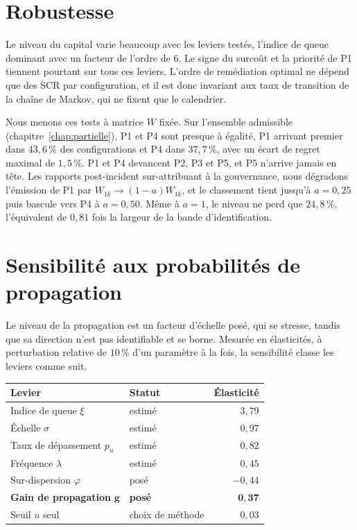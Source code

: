 \section{Robustesse}
\label{sec:res-robustesse}

Le niveau du capital varie beaucoup avec les leviers testés, l'indice de queue dominant avec
un facteur de l'ordre de $6$. Le signe du surcoût et la priorité de P1 tiennent pourtant sur tous
ces leviers. L'ordre de remédiation optimal ne dépend que des SCR par configuration, et il
est donc invariant aux taux de transition de la chaîne de Markov, qui ne fixent que le calendrier.

Nous menons ces tests à matrice $W$ fixée. Sur l'ensemble admissible (chapitre~\ref{chap:partielle}),
P1 et P4 sont presque à égalité, P1 arrivant premier dans $43{,}6\,\%$ des configurations et P4 dans
$37{,}7\,\%$, avec un écart de regret maximal de $1{,}5\,\%$. P1 et P4 devancent P2, P3 et
P5, et P5 n'arrive jamais en tête. Les rapports post-incident sur-attribuant à la gouvernance, nous
dégradons l'émission de P1 par $W_{1k}\to(1-a)W_{1k}$, et le classement tient jusqu'à $a=0{,}25$
puis bascule vers P4 à $a=0{,}50$. Même à $a=1$, le niveau ne perd que $24{,}8\,\%$, l'équivalent de
$0{,}81$ fois la largeur de la bande d'identification.

\section{Sensibilité aux probabilités de propagation}
\label{sec:sensibilite-propagation}

Le niveau de la propagation est un facteur d'échelle posé, qui se stresse, tandis que sa direction
n'est pas identifiable et se borne. Mesurée en élasticités, à perturbation relative de $10\,\%$ d'un paramètre
à la fois, la sensibilité classe les leviers comme suit.

\begin{center}\footnotesize
\renewcommand{\arraystretch}{1.15}
\begin{tabular}{@{}l l r@{}}
\toprule
\textbf{Levier} & \textbf{Statut} & \textbf{Élasticité} \\
\midrule
Indice de queue $\xi$ & estimé & $3{,}79$ \\
Échelle $\sigma$ & estimé & $0{,}97$ \\
Taux de dépassement $p_u$ & estimé & $0{,}82$ \\
Fréquence $\lambda$ & estimé & $0{,}45$ \\
Sur-dispersion $\varphi$ & posé & $-0{,}44$ \\
\textbf{Gain de propagation} $\boldsymbol{g}$ & \textbf{posé} & $\mathbf{0{,}37}$ \\
Seuil $u$ seul & choix de méthode & $0{,}03$ \\
\bottomrule
\end{tabular}
\end{center}

